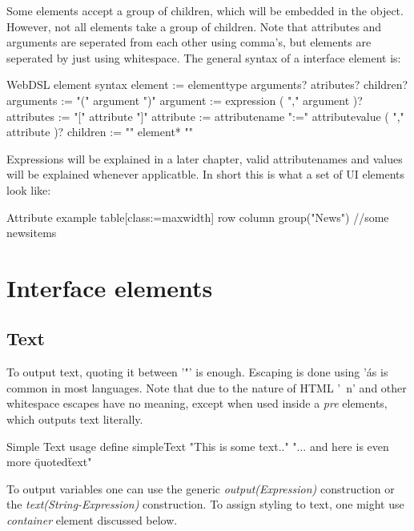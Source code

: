 Some elements accept a group of children, which will be embedded in the object. However, not all elements take a group of children. Note that attributes and arguments are seperated from each other using comma's, but elements are seperated by just using whitespace. 
The general syntax of a interface element is:
\begin{webdsl}{WebDSL element syntax}
element	:= elementtype arguments? atributes? children?
arguments	:= "(" argument ")"
argument	:= expression ( "," argument )?
attributes	:= "[" attribute "]"
attribute := attributename ":=" attributevalue ( "," attribute )?
children	:= "{" element* "}"
\end{webdsl}
Expressions will be explained in a later chapter, valid attributenames and values will be explained whenever applicatble. In short this is what a set of UI elements look like:
\begin{webdsl}{Attribute example}
table[class:=maxwidth] {
  row {
    column {
      group("News") {
				//some newsitems
			}
		}
	}
}
\end{webdsl}

\section{Interface elements}
\subsection{Text}
To output text, quoting it between '"' is enough. Escaping is done using '\' as is common in most languages. Note that due to the nature of HTML '\ n' and other whitespace escapes have no meaning, except when used inside a \emph{pre} elements, which outputs text literally.
\begin{webdsl}{Simple Text usage}
define simpleText {
	"This is some text.." "... and here is even more \"quoted\" text"
}
\end{webdsl}
To output variables one can use the generic \emph{output(Expression)} construction or the \emph{text(String-Expression)} construction. To assign styling to text, one might use \emph{container} element discussed below. 


